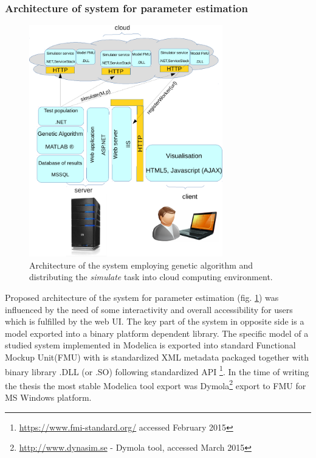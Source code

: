 \subsubsection{Architecture of system for parameter estimation}
\begin{figure}[hbt]
    \centering
     \includegraphics[page=1,width=0.75\textwidth]{chapter3/architekturaestimation-crop.pdf}  
    \caption{Architecture of the system employing genetic algorithm and distributing the \emph{simulate} task into cloud computing environment.}
    \label{fig:architectureestimation}
\end{figure}
Proposed architecture of the system for parameter estimation (fig. \ref{fig:architectureestimation}) was influenced by the need of some interactivity and overall accessibility for users which is fulfilled by the web UI. The key part of the system in opposite side is a model exported into a binary platform dependent library. 
The specific model of a studied system implemented in Modelica is exported into standard Functional Mockup Unit(FMU) with is standardized XML metadata packaged together with  binary library .DLL (or .SO) following standardized API \cite{Blochwitza}\footnote{\url{https://www.fmi-standard.org/} accessed February 2015}. In the time of writing the thesis the most stable Modelica tool export was Dymola\footnote{\url{http://www.dynasim.se} - Dymola tool, accessed March 2015} export to FMU for MS Windows platform. 

